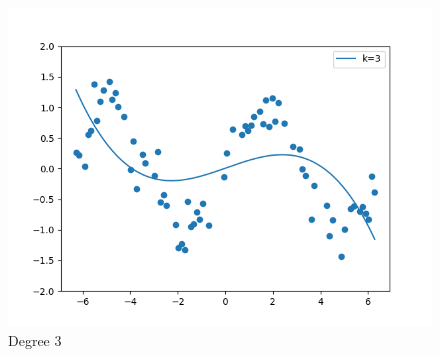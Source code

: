 \newcommand\tab[1][1cm]{\hspace*{#1}}
\begin{answer}
\\ \\ 

\begin{figure}[h!]
\centering
  \includegraphics[width=.7\linewidth]{featuremaps/5b.png}
\caption{Degree 3}
\label{fig:test}
\end{figure}
\end{answer}
